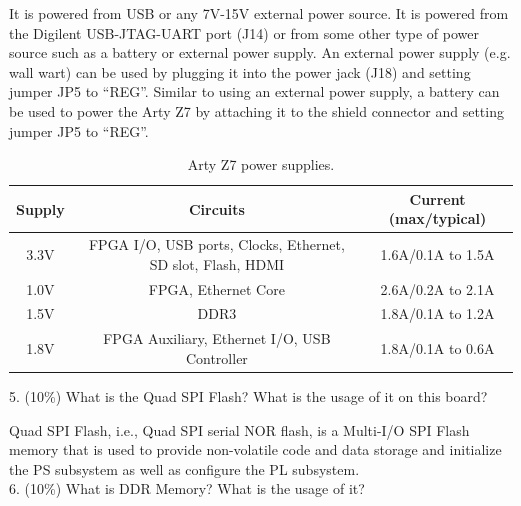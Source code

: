 \documentclass[a4paper]{article}
\begin{document}
It is powered from USB or any 7V-15V external power source. It is powered from the Digilent USB-JTAG-UART port (J14) or from some other type of power source such as a battery or external power supply. An external power supply (e.g. wall wart) can be used by plugging it into the power jack (J18) and setting jumper JP5 to “REG”. Similar to using an external power supply, a battery can be used to power the Arty Z7 by attaching it to the shield connector and setting jumper JP5 to “REG”.
\begin{table}[H]
    \centering
    \begin{tabular}{|c|c|c|}
        \hline
        Supply&Circuits&Current (max/typical)\\
        \hline
        3.3V&FPGA I/O, USB ports, Clocks, Ethernet, SD slot, Flash, HDMI&1.6A/0.1A to 1.5A\\
        \hline
        1.0V&FPGA, Ethernet Core&2.6A/0.2A to 2.1A\\
        \hline
        1.5V&DDR3&1.8A/0.1A to 1.2A\\
        \hline
        1.8V&FPGA Auxiliary, Ethernet I/O, USB Controller&1.8A/0.1A to 0.6A\\
        \hline
    \end{tabular}
    \caption{Arty Z7 power supplies.}
\end{table}
5. (10\%) What is the Quad SPI Flash? What is the usage of it on this board?

Quad SPI Flash, i.e., Quad SPI serial NOR flash, is a Multi-I/O SPI Flash memory that is used to provide non-volatile code and data storage and initialize the PS subsystem as well as configure the PL subsystem.\\
6. (10\%) What is DDR Memory? What is the usage of it?
\end{document}
